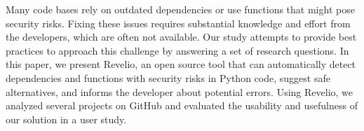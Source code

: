Many code bases rely on outdated dependencies or use functions that might pose security risks. Fixing these issues requires substantial knowledge and effort from the developers, which are often not available. Our study attempts to provide best practices to approach this challenge by answering a set of research questions. In this paper, we present Revelio, an open source tool that can automatically detect dependencies and functions with security risks in Python code, suggest safe alternatives, and informs the developer about potential errors. Using Revelio, we analyzed several projects on GitHub and evaluated the usability and usefulness of our solution in a user study.  
